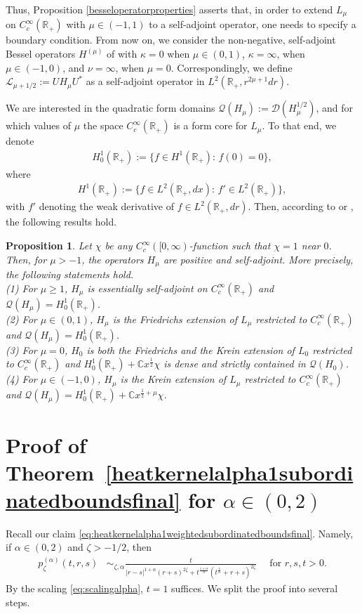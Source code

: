 \documentclass[12pt,reqno,a4paper]{amsart}
\newtheorem{proposition}[theorem]{Proposition}
\theoremstyle{definition}
\theoremstyle{remark}
\numberwithin{equation}{section}
\newcommand{\1}{\mathbbm{1}}
\newcommand{\C}{\mathbb{C}}
\newcommand{\D}{\mathcal{D}}
\newcommand{\R}{\mathbb{R}}
\def\cl{\mathcal{L}}
\def\cq{\mathcal{Q}}
\begin{document}
Thus, Proposition \ref{besseloperatorproperties} asserts that, in order to extend $L_\mu$ on $C_c^\infty(\R_+)$ with $\mu\in(-1,1)$ to a self-adjoint operator, one needs to specify a boundary condition. From now on, we consider the non-negative, self-adjoint Bessel operators $H^{(\mu)}$ of \cite{Bruneauetal2011} with $\kappa=0$ when $\mu\in(0,1)$, $\kappa=\infty$, when $\mu\in(-1,0)$, and $\nu=\infty$, when $\mu=0$. Correspondingly, we define $\cl_{\mu+1/2}:=UH_{\mu}U^*$ as a self-adjoint operator in $L^2(\R_+,r^{2\mu+1}dr)$.

We are interested in the quadratic form domains $\cq(H_\mu):=\D(H_\mu^{1/2})$, and for which values of $\mu$ the space $C_c^\infty(\R_+)$ is a form core for $L_\mu$. To that end, we denote
\begin{align}
  H_0^1(\R_+) := \{f\in H^1(\R_+):\,f(0)=0\},
\end{align}
where
\begin{align}
  H^1(\R_+) := \{f\in L^2(\R_+,dx):\, f' \in L^2(\R_+)\},
\end{align}
with $f'$ denoting the weak derivative of $f\in L^2(\R_+,dr)$. Then, according to \cite[Theorem~4.22]{Bruneauetal2011} or \cite[Theorem~8.4]{DerezinskiGeorgescu2021}, the following results hold.

\begin{proposition}
  \label{besseldomain}
  Let $\chi$ be any $C_c^\infty([0,\infty)$-function such that $\chi=1$ near $0$.
  Then, for $\mu>-1$, the operators $H_\mu$ are positive and self-adjoint. More precisely, the following statements hold. \\
  \textup{(1)} For $\mu\geq1$, $H_\mu$ is essentially self-adjoint on $C_c^\infty(\R_+)$ and $\cq(H_\mu)=H_0^1(\R_+)$.
  \\
  \textup{(2)} For $\mu\in(0,1)$, $H_\mu$ is the Friedrichs extension of $L_\mu$ restricted to $C_c^\infty(\R_+)$ and $\cq(H_\mu)=H_0^1(\R_+)$.
  \\
  \textup{(3)} For $\mu=0$, $H_0$ is both the Friedrichs and the Krein extension of $L_0$ restricted to $C_c^\infty(\R_+)$ and $H_0^1(\R_+)+\C x^{\frac12}\chi$ is dense and strictly contained in $\cq(H_0)$.
  \\
  \textup{(4)} For $\mu\in(-1,0)$, $H_\mu$ is the Krein extension of $L_\mu$ restricted to $C_c^\infty(\R_+)$ and $\cq(H_\mu)= H_0^1(\R_+) + \C x^{\frac12+\mu}\chi$.
\end{proposition}
\fi

\section{Proof of Theorem~\ref{heatkernelalpha1subordinatedboundsfinal} for $\alpha\in(0,2)$}
\label{s:proofheatkernelalpha1subordinatedboundsfinal}
Recall our claim \eqref{eq:heatkernelalpha1weightedsubordinatedboundsfinal}. Namely, if
$\alpha\in(0,2)$ and $\zeta>-1/2$, then
\begin{align*}
  p_\zeta^{(\alpha)}(t,r,s)
  & \sim_{\zeta,\alpha} \frac{t}{|r-s|^{1+\alpha}(r+s)^{2\zeta} + t^{\frac{1+\alpha}{\alpha}}(t^{\frac1\alpha}+r+s)^{2\zeta}}\quad \mbox{ for $r,s,t>0$.}
\end{align*}
By the scaling \eqref{eq:scalingalpha},  
$t=1$ suffices. We split the proof into several steps.
\end{document}
